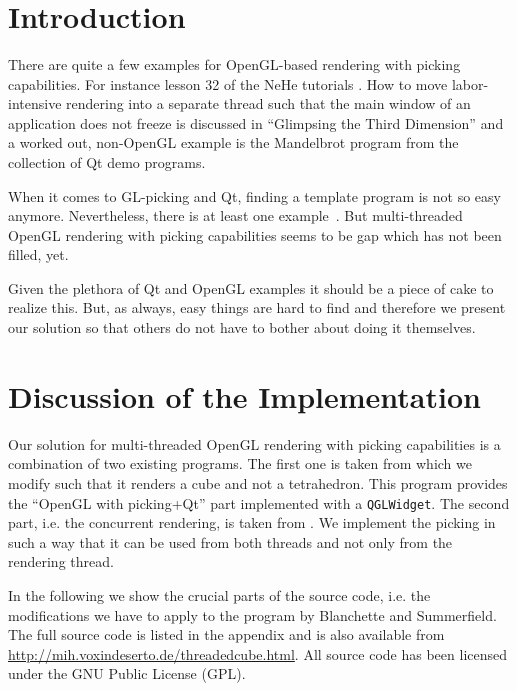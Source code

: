 \documentclass[jou,noapacite]{apa}
\title{
\mytitle
}
\begin{document}
\maketitle
%
%
\section{Introduction}
\label{sec:Introduction}

There are quite a few examples for OpenGL-based rendering with picking
capabilities.
%
For instance lesson 32 of the NeHe tutorials \cite{nehe32}.
%
How to move labor-intensive rendering into a separate thread such that the main
window of an application does not freeze is discussed in ``Glimpsing the Third
Dimension'' \cite{glimpse3d} and a worked out, non-OpenGL example is the
Mandelbrot program from the collection of Qt demo programs.

When it comes to GL-picking and Qt, finding a template program is not so easy
anymore.
%
Nevertheless, there is at least one example~\cite{Blanchette2008}.
%
But multi-threaded OpenGL rendering with picking capabilities seems to be gap
which has not been filled, yet.

Given the plethora of Qt and OpenGL examples it should be a piece of cake to
realize this.
%
But, as always, easy things are hard to find and therefore we present our
solution so that others do not have to bother about doing it themselves.




\section{Discussion of the Implementation}

Our solution for multi-threaded OpenGL rendering with picking capabilities is a
combination of two existing programs.
%
The first one is taken from \cite[chapter 8]{Blanchette2008} which we modify
such that it renders a cube and not a tetrahedron. This program provides the
``OpenGL with picking+Qt'' part implemented with a \lstinline|QGLWidget|.
%
The second part, i.e. the concurrent rendering, is taken from \cite{glimpse3d}.
%
We implement the picking in such a way that it can be used from both threads
and not only from the rendering thread.


In the following we show the crucial parts of the source code, i.e. the
modifications we have to apply to the program by Blanchette and Summerfield.
%
The full source code is listed in the appendix and is also available from
\url{http://mih.voxindeserto.de/threadedcube.html}. All source code has been
licensed under the GNU Public License (GPL).
\end{document}
